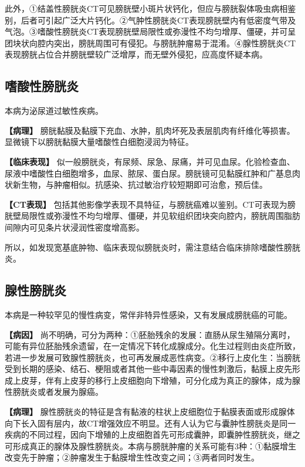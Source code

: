 此外，①结盖性膀胱炎CT可见膀胱壁小斑片状钙化，但应与膀胱裂体吸虫病相鉴别，后者可引起广泛大片钙化。②气肿性膀胱炎CT表现膀胱壁内有低密度气带及气泡。③嗜酸性膀胱炎CT表现膀胱壁局限性或弥漫性不均匀增厚、僵硬，并可呈团块状向腔内突出，膀胱周围可有侵犯。与膀胱肿瘤易于混淆。④腺性膀胱炎CT表现膀胱占位合并膀胱壁较广泛增厚，而无壁外侵犯，应高度怀疑本病。

\subsection{嗜酸性膀胱炎}

本病为泌尿道过敏性疾病。

\textbf{【病理】}
膀胱黏膜及黏膜下充血、水肿，肌肉坏死及表层肌肉有纤维化等损害。显微镜下以膀胱黏膜大量嗜酸性白细胞浸润为特征。

\textbf{【临床表现】}
似一般膀胱炎，有尿频、尿急、尿痛，并可见血尿。化验检查血、尿液中嗜酸性白细胞增多，血尿、脓尿、蛋白尿。膀胱镜可见黏膜红肿和广基息肉状新生物，与肿瘤相似。抗感染、抗过敏治疗较短期即可治愈，预后佳。

\textbf{【CT表现】}
包括其他影像学表现不具特征，与膀胱癌难以鉴别。CT可表现为膀胱壁局限性或弥漫性不均匀增厚、僵硬，并见软组织团块突向腔内，膀胱周围脂肪间隙内可见条片状浸润性密度增高影。

所以，如发现宽基底肿物、临床表现似膀胱炎时，需注意结合临床排除嗜酸性膀胱炎。

\subsection{腺性膀胱炎}

本病是一种较罕见的慢性病变，常伴非特异性感染，又有发展成膀胱癌的可能。

\textbf{【病因】}
尚不明确，可分为两种：①胚胎残余的发展：直肠从尿生殖隔分离时，可能有异位胚胎残余遗留，在一定情况下转化成腺成分。化生过程则由炎症所致，若进一步发展可致腺性膀胱炎，也可再发展成恶性病变。②移行上皮化生：当膀胱受到长期的感染、结石、梗阻或者其他一些中毒因素的慢性刺激后，黏膜上皮先形成上皮芽，伴有上皮芽的移行上皮细胞向下增殖，可分化成为真正的腺体，成为腺性膀胱炎或者发展为腺癌。

\textbf{【病理】}
腺性膀胱炎的特征是含有黏液的柱状上皮细胞位于黏膜表面或形成腺体向下长入固有层内，故CT增强效应不明显。还有人认为它与囊肿性膀胱炎是同一疾病的不同过程，因向下增殖的上皮细胞首先可形成囊肿，即囊肿性膀胱炎，继之可形成真正的腺体及腺性膀胱炎。本病与膀胱肿瘤的关系可能有3种：①黏膜增生改变先于肿瘤；②肿瘤发生于黏膜增生性改变之间；③两者同时发生。

